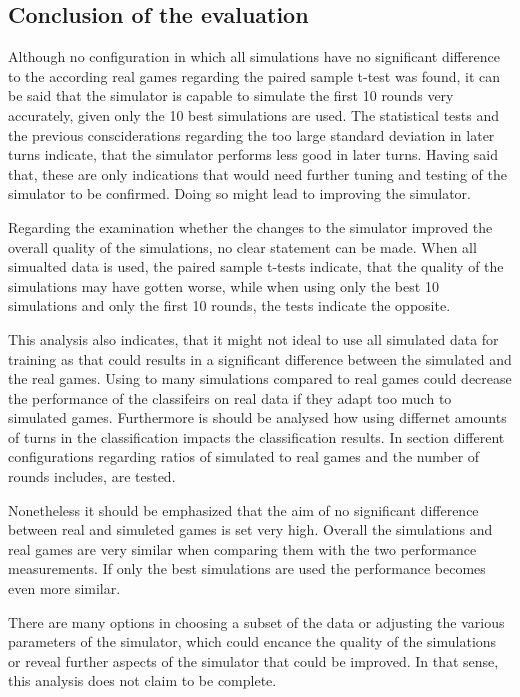 \subsection{Conclusion of the evaluation}
Although no configuration in which all simulations have no significant difference to the according real games regarding the paired sample t-test was found, it can be said that the simulator is capable to simulate the first 10 rounds very accurately, given only the 10 best simulations are used. The statistical tests and the previous consciderations regarding the too large standard deviation in later turns indicate, that the simulator performs less good in later turns. Having said that, these are only indications that would need further tuning and testing of the simulator to be confirmed. Doing so might lead to improving the simulator. 

Regarding the examination whether the changes to the simulator improved the overall quality of the simulations, no clear statement can be made. When all simualted data is used, the paired sample t-tests indicate, that the quality of the simulations may have gotten worse, while when using only the best 10 simulations and only the first 10 rounds, the tests indicate the opposite. 

This analysis also indicates, that it might not ideal to use all simulated data for training as that could results in a significant difference between the simulated and the real games. Using to many simulations compared to real games could decrease the performance of the classifeirs on real data if they adapt too much to simulated games. Furthermore is should be analysed how using differnet amounts of turns in the classification impacts the classification results. In section  different configurations regarding ratios of simulated to real games and the number of rounds includes, are tested. 

Nonetheless it should be emphasized that the aim of no significant difference between real and simuleted games is set very high. Overall the simulations and real games are very similar when comparing them with the two performance measurements. If only the best simulations are used the performance becomes even more similar.  

There are many options in choosing a subset of the data or adjusting the various parameters of the simulator, which could encance the quality of the simulations or reveal further aspects of the simulator that could be improved. In that sense, this analysis does not claim to be complete.

